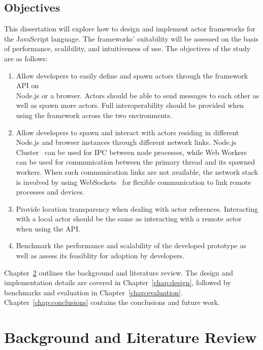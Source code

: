 \documentclass[oneside]{um-fict}
\begin{document}
\section{Objectives}\label{section:objectives}
This dissertation will explore how to design and implement actor frameworks for the JavaScript language. The frameworks' suitability will be assessed on the basis of performance, scalibility, and intuitiveness of use. The objectives of the study are as follows:
\begin{enumerate}
    \item Allow developers to easily define and spawn actors through the framework API on \\Node.js or a browser. Actors should be able to send messages to each other as well as spawn more actors. Full interoperability should be provided when using the framework across the two environments.
    \item Allow developers to spawn and interact with actors residing in different Node.js and browser instances through different network links. Node.js Cluster~\cite{cluster} can be used for IPC between node processes, while Web Workers~\cite{webworkers} can be used for communication between the primary thread and its spawned workers. When such communication links are not available, the network stack is involved by using WebSockets~\cite{websocket} for flexible communication to link remote processes and devices.
    \item Provide location transparency when dealing with actor references. Interacting with a local actor should be the same as interacting with a remote actor when using the API.
    \item Benchmark the performance and scalability of the developed prototype as well as assess its feasiblity for adoption by developers.
\end{enumerate}

Chapter~\ref{chap:background} outlines the background and literature review. The design and implementation details are covered in Chapter~\ref{chap:design}, followed by benchmarks and evaluation in Chapter~\ref{chap:evaluation}. Chapter~\ref{chap:conclusions} contains the conclusions and future work.

\chapter{Background and Literature Review}\label{chap:background}
\end{document}
